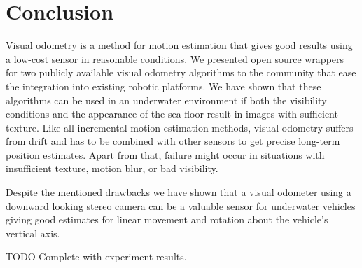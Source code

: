 \documentclass[conference]{IEEEtran}
\begin{document}
\section{Conclusion
  \label{conclusion}
}

Visual odometry is a method for motion estimation that gives good results using a low-cost sensor in reasonable conditions. We presented open source wrappers for two publicly available visual odometry algorithms to the community that ease the integration into existing robotic platforms.
We have shown that these algorithms can be used in an underwater environment if both the visibility conditions and the appearance of the sea floor result in images with sufficient texture. Like all incremental motion estimation methods, visual odometry suffers from drift and has to be combined with other sensors to get precise long-term position estimates. Apart from that, failure might occur in situations with insufficient texture, motion blur, or bad visibility.

Despite the mentioned drawbacks we have shown that a visual odometer using a downward looking stereo camera can be a valuable sensor for underwater vehicles giving good estimates for linear movement and rotation about the vehicle's vertical axis.

TODO Complete with experiment results.




\end{document}
